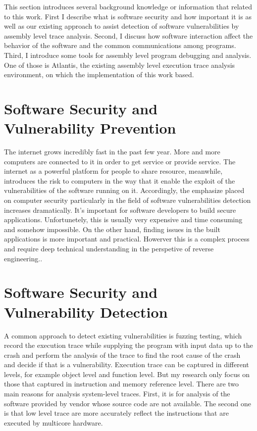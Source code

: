 \label{chapter:Bac}
This section introduces several background knowledge or information that related to this work. First I describe what is software security and how important it is as well as our existing approach to assist detection of software vulnerabilities by assembly level trace analysis. Second, I discuss how software interaction affect the behavior of the software and the common communications among programs. Third, I introduce some tools for assembly level program debugging and analysis. One of those is Atlantis, the existing assembly level execution trace analysis environment, on which the implementation of this work based.

\section{Software Security and Vulnerability Prevention}
The internet grows incredibly fast in the past few year. More and more computers are connected to it in order to get service or provide service. The internet as a powerful platform for people to share resource, meanwhile, introduces the risk to computers in the way that it enable the exploit of the vulnerabilities of the software running on it. Accordingly, the emphasize placed on computer security particularly in the field of software vulnerabilities detection increases dramatically. It's important for software developers to build secure applications. Unfortunetely, this is usually very expensive and time consuming and somehow impossible. On the other hand, finding issues in the built applications is more important and practical. Howerver this is a complex process and require deep technical understanding in the perspetive of reverse engineering.\cite{dowd_art_2006}.


\section{Software Security and Vulnerability Detection}
A common approach to detect existing vulnerabilities is fuzzing testing, which record the execution trace while supplying the program with input data up to the crash and perform the analysis of the trace to find the root cause of the crash and decide if that is a vulnerability\cite{cleary_reconstructing_2013}. Execution trace can be captured in different levels, for example object level and function level. But my research only focus on those that captured in instruction and memory reference level. There are two main reasons for analysis system-level traces. First, it is for analysis of the software provided by vendor whose source code are not available. The second one is that low level trace are more accurately reflect the instructions that are executed by multicore hardware\cite{wang_predicting_2011}. 

